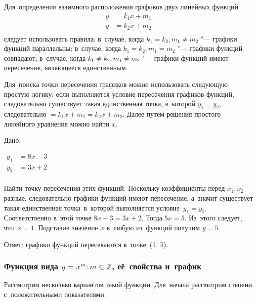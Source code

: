\documentclass[]{scrartcl}
\begin{document}
Для~определения взаимного расположения графиков двух линейных функций
\begin{equation*}\label{eq:linear-func-3}
\begin{aligned}
y&=k_{1}x+m_1\\
y&=k_{2}x+m_2\\
\end{aligned}
\end{equation*}
следует использовать правила: в~случае, когда $k_1=k_2, m_1 \neq m_2$ "--- графики функций параллельны; в~случае, когда $k_1=k_2, m_1=m_2$ "--- графики функций совпадают; в~случае, когда $k_1 \neq k_2, m_1 \neq m_2$ "--- графики функций имеют пересечение, являющееся единственным. 

Для~поиска точки пересечения графиков можно использовать следующую простую логику: если выполняется условие пересечения графиков функций, следовательно существует такая единственная точка, в~которой $y_1=y_2$, следовательно $=k_{1}x+m_1 = k_{2}x+m_2$. Далее путём решения простого линейного уравнения можно найти $x$.

\begin{Thexmpl}\label{ex:two-linear-1}
	Дано:
	
	$\begin{aligned}
	y_{1}&=8x - 3\\
	y_{2}&=3x + 2\\
	\end{aligned}$
	
	Найти точку пересечения этих функций. Поскольку коэффициенты перед $x_1, x_2$ разные, следовательно графики функций имеют пересечение, а~значит существует такая единственная точка~в~которой выполняется условие~$y_1=y_2$. Соответственно в~этой точке $8x - 3 = 3x + 2$. Тогда $5x=5$. Из~этого следует, что~$x=1$. Подставив значение $x$ в~любую из~функций получим $y=5$.
	
	Ответ: графики функций пересекаются в~точке~(1, 5).
\end{Thexmpl}

\subsubsection{Функция вида ${\textstyle y=x^m:m \in \mathbb{Z}}$, её~свойства и~график}
Рассмотрим несколько вариантов такой функции. Для~начала рассмотрим степени с~положительными показателями.
\end{document}
